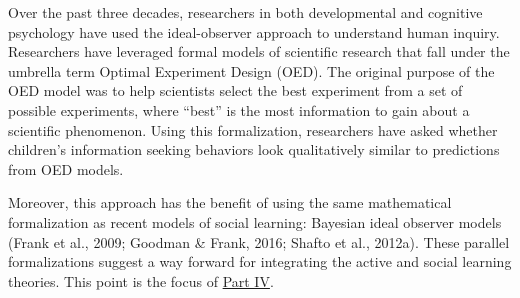 \documentclass[english,floatsintext,man]{apa6}
\theoremstyle{definition}
\theoremstyle{definition}
\theoremstyle{definition}
\theoremstyle{remark}
\begin{document}
Over the past three decades, researchers in both developmental and
cognitive psychology have used the ideal-observer approach to understand
human inquiry. Researchers have leveraged formal models of scientific
research that fall under the umbrella term Optimal Experiment Design
(OED). The original purpose of the OED model was to help scientists
select the best experiment from a set of possible experiments, where
\enquote{best} is the most information to gain about a scientific
phenomenon. Using this formalization, researchers have asked whether
children's information seeking behaviors look qualitatively similar to
predictions from OED models.

Moreover, this approach has the benefit of using the same mathematical
formalization as recent models of social learning: Bayesian ideal
observer models (Frank et al., 2009; Goodman \& Frank, 2016; Shafto et
al., 2012a). These parallel formalizations suggest a way forward for
integrating the active and social learning theories. This point is the
focus of \protect\hyperlink{p4}{Part IV}.

\end{document}

